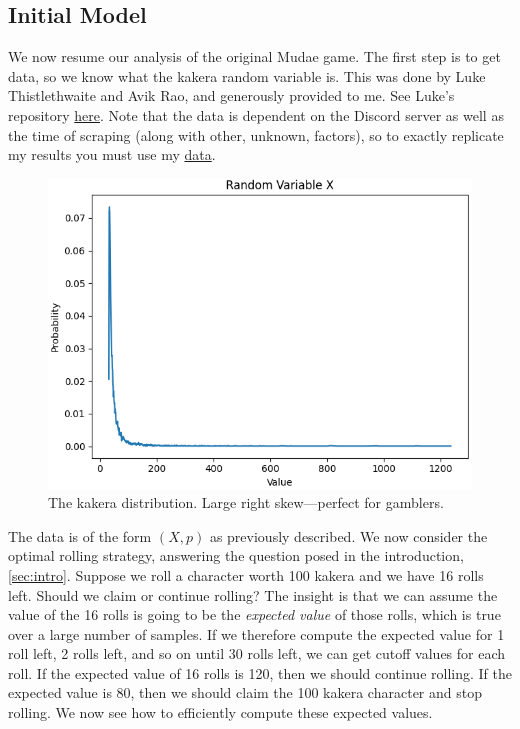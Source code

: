 \documentclass[11pt, oneside]{article}
\theoremstyle{plain}
\theoremstyle{definition}
\begin{document}
\subsection{Initial Model}
We now resume our analysis of the original Mudae game. The first step is
to get data, so we know what the kakera random variable is. This was done
by Luke Thistlethwaite and Avik Rao, and generously provided to me. See
Luke's repository \href{https://github.com/lthistle/mudae-optimizer}{here}.
Note that the data is dependent on the Discord server as well as the time
of scraping (along with other, unknown, factors), so to exactly replicate
my results you must use my
\href{https://github.com/stephen-huan/probabilistic-rolling/tree/master/problib/data/complete}{data}.
\begin{figure}[h!]
  \centering
  \includegraphics[scale=0.5]{graphs/random_variables/kakera}
  \caption{The kakera distribution. Large right skew---perfect for gamblers.}
\end{figure}

The data is of the form \( (X, p) \) as previously described. We now consider
the optimal rolling strategy, answering the question posed in the introduction,
\autoref{sec:intro}. Suppose we roll a character worth 100 kakera and we have
16 rolls left. Should we claim or continue rolling? The insight is that we can
assume the value of the 16 rolls is going to be the \textit{expected value}
of those rolls, which is true over a large number of samples. If we therefore
compute the expected value for 1 roll left, 2 rolls left, and so on until 30
rolls left, we can get cutoff values for each roll. If the expected value of
16 rolls is 120, then we should continue rolling. If the expected value is 80,
then we should claim the 100 kakera character and stop rolling. We now see how
to efficiently compute these expected values.
\end{document}
